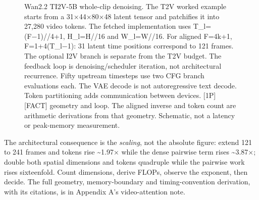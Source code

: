 \begin{figure}
\centering
{}
\caption[Wan2.2 TI2V-5B whole-clip denoising]{Wan2.2 TI2V-5B whole-clip denoising. The T2V worked example starts from a 31×44×80×48 latent tensor and patchifies it into 27,280 video tokens. The fetched implementation uses T\_l=(F−1)//4+1, H\_l=H//16 and W\_l=W//16. For aligned F=4k+1, F=1+4(T\_l−1): 31 latent time positions correspond to 121 frames. The optional I2V branch is separate from the T2V budget. The feedback loop is denoising/scheduler iteration, not architectural recurrence. Fifty upstream timesteps use two CFG branch evaluations each. The VAE decode is not autoregressive text decode. Token partitioning adds communication between devices. \mbox{{[}1P{]}}\hspace{0pt}\mbox{{[}FACT{]}} geometry and loop. The aligned inverse and token count are arithmetic derivations from that geometry. Schematic, not a latency or peak-memory measurement.}

\label{fig:8.3}\end{figure}

The architectural consequence is the \emph{scaling}, not the absolute
figure: extend 121 to 241 frames and tokens rise \textasciitilde1.97×
while the dense pairwise term rises \textasciitilde3.87×; double both
spatial dimensions and tokens quadruple while the pairwise work rises
sixteenfold. Count dimensions, derive FLOPs, observe the exponent, then
decide. The full geometry, memory-boundary and timing-convention
derivation, with its citations, is in Appendix A's video-attention note.

